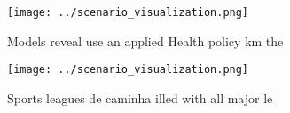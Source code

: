 \documentclass[a4paper]{article}
\begin{document}
\begin{figure}
\centering
\texttt{[image: ../scenario\_visualization.png]}
\caption{Models reveal use an applied Health policy km the
}
\end{figure}
 
\begin{figure}
\centering
\texttt{[image: ../scenario\_visualization.png]}
\caption{Sports leagues de caminha illed with all major le
}
\end{figure}
 
\end{document}
